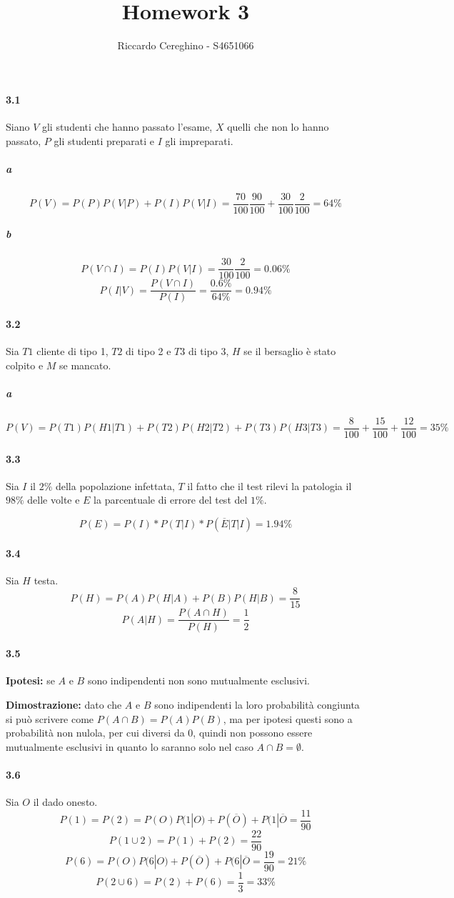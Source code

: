 \documentclass{article}
\begin{document}
\title{Homework 3}
\author{Riccardo Cereghino - S4651066}
\maketitle

\paragraph{3.1}%
\label{par:3.1}
Siano $V$ gli studenti che hanno passato l'esame, $X$ quelli che non lo hanno
passato, $P$ gli studenti preparati e $I$ gli impreparati.
\subparagraph{a}%
\label{subp:a}
\[
  P(V)=P(P)P(V|P)+P(I)P(V|I)= \frac{70}{100}\frac{90}{100}+\frac{30}{100}
  \frac{2}{100}=64\%   
\]
\subparagraph{b}%
\label{subp:b}
\[
  P(V\cap I)=P(I)P(V|I)= \frac{30}{100} \frac{2}{100}=0.06\%
\]
\[
  P(I|V)= \frac{P(V\cap I)}{P(I)}= \frac{0.6\%}{64\%}=0.94\%
\]
\paragraph{3.2}%
\label{par:3.2}
Sia $T1$ cliente di tipo 1, $T2$ di tipo 2 e $T3$ di tipo 3, $H$ se il bersaglio
è stato colpito e $M$ se mancato.
\subparagraph{a}%
\label{subp:a}
\[
  P(V)=P(T1)P(H1|T1)+P(T2)P(H2|T2)+P(T3)P(H3|T3)=
  \frac{8}{100}+\frac{15}{100}+\frac{12}{100}=35\%
\]

\paragraph{3.3}%
\label{par:3.3}
Sia $I$ il $2\%$ della popolazione infettata, $T$ il fatto che il test rilevi la
patologia il $98\%$ delle volte e $E$ la parcentuale di errore del test del
$1\%$.

\[
  P(E)=P(I)*P(T|I)*P(\overline{E}|T|I)=1.94\%
\]

\paragraph{3.4}%
\label{par:3.4}
Sia $H$ testa.
\[
  P(H)=P(A)P(H|A)+P(B)P(H|B)= \frac{8}{15} 
\]
\[
  P(A|H)= \frac{P(A\cap H)}{P(H)}= \frac{1}{2} 
\]

\paragraph{3.5}%
\label{par:3.5}
\textbf{Ipotesi:} se $A$ e $B$ sono indipendenti non sono mutualmente esclusivi.

\textbf{Dimostrazione:} dato che $A$ e $B$ sono indipendenti la loro probabilità
congiunta si può scrivere come $P(A\cap B)=P(A)P(B)$, ma per ipotesi questi sono
a probabilità non nulola, per cui diversi da $0$, quindi non possono essere
mutualmente esclusivi in quanto lo saranno solo nel caso $A\cap B=\emptyset$.

\paragraph{3.6}%
\label{par:3.6}
Sia $O$ il dado onesto.
\[
  P(1)=P(2)=P(O)P(1|O)+P(\overline{O})+P(1|\overline{O}= \frac{11}{90}
\]
\[
  P(1\cup2)=P(1)+P(2)= \frac{22}{90} 
\]
\[
  P(6)=P(O)P(6|O)+P(\overline{O})+P(6|\overline{O}= \frac{19}{90}=21\%
\]
\[
  P(2\cup6)=P(2)+P(6)= \frac{1}{3}=33\% 
\]
\end{document}
